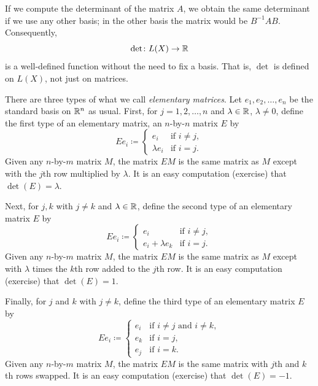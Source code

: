 If we compute the determinant of the matrix $A$, we obtain
the same determinant if we use any other basis;
in the other basis the matrix would be $B^{-1}AB$.
Consequently,
\begin{equation*}
\det \colon L(X) \to \R
\avoidbreak
\end{equation*}
is a well-defined function without the need to fix a basis.
That is, $\det$ is defined on $L(X)$, not just on matrices.

\medskip

There are three types of what we call
\emph{elementary matrices}.
Let
$e_1,e_2,\ldots,e_n$ be the standard basis on ${\mathbb{R}}^n$ as usual.
First,
for $j =
1,2,\ldots,n$ and
$\lambda \in {\mathbb{R}}$, $\lambda \neq 0$, define
the first type of an elementary matrix,
an
$n$-by-$n$ matrix $E$ by
\begin{equation*}
Ee_i \coloneqq 
\begin{cases}
e_i & \text{if } i \neq j , \\
\lambda e_i & \text{if } i = j .
\end{cases}
\end{equation*}
Given any $n$-by-$m$ matrix $M$, the matrix $EM$ is the same matrix as $M$
except with the $j$th row multiplied by $\lambda$.
It is an easy computation (exercise) that $\det(E) = \lambda$.

Next, for $j,k$ with $j\neq k$ and $\lambda \in {\mathbb{R}}$,
define the second type of an elementary matrix $E$ by
\begin{equation*}
Ee_i \coloneqq 
\begin{cases}
e_i               & \text{if } i \neq j , \\
e_i + \lambda e_k & \text{if } i = j .
\end{cases}
\end{equation*}
Given any $n$-by-$m$ matrix $M$, the matrix $EM$ is the same matrix as $M$
except with $\lambda$ times the $k$th row added to the $j$th row.
It is an easy computation (exercise) that $\det(E) = 1$.

Finally, for $j$ and $k$ with $j\neq k$, define
the third type of an elementary matrix $E$ by
\begin{equation*}
Ee_i \coloneqq 
\begin{cases}
e_i & \text{if } i \neq j \text{ and } i \neq k , \\
e_k & \text{if } i = j , \\
e_j & \text{if } i = k .
\end{cases}
\end{equation*}
Given any $n$-by-$m$ matrix $M$, the matrix $EM$ is the same matrix with
$j$th and $k$th rows swapped.
It is an easy computation (exercise) that $\det(E) = -1$.

